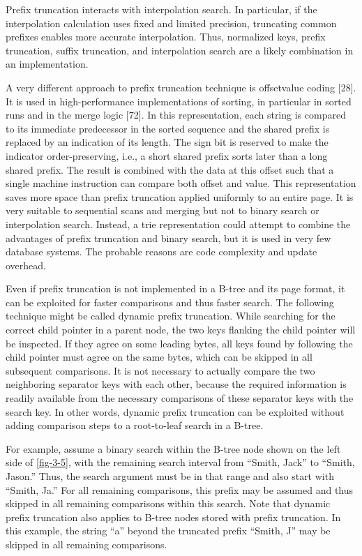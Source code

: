 Prefix truncation interacts with interpolation search. In particular, if
the interpolation calculation uses fixed and limited precision,
truncating common prefixes enables more accurate interpolation. Thus,
normalized keys, prefix truncation, suffix truncation, and interpolation
search are a likely combination in an implementation.

A very different approach to prefix truncation technique is offsetvalue
coding {[}28{]}. It is used in high-performance implementations of
sorting, in particular in sorted runs and in the merge logic {[}72{]}.
In this representation, each string is compared to its immediate
predecessor in the sorted sequence and the shared prefix is replaced by
an indication of its length. The sign bit is reserved to make the
indicator order-preserving, i.e., a short shared prefix sorts later than
a long shared prefix. The result is combined with the data at this
offset such that a single machine instruction can compare both offset
and value. This representation saves more space than prefix truncation
applied uniformly to an entire page. It is very suitable to sequential
scans and merging but not to binary search or interpolation search.
Instead, a trie representation could attempt to combine the advantages
of prefix truncation and binary search, but it is used in very few
database systems. The probable reasons are code complexity and update
overhead.

Even if prefix truncation is not implemented in a B-tree and its page
format, it can be exploited for faster comparisons and thus faster
search. The following technique might be called dynamic prefix
truncation. While searching for the correct child pointer in a parent
node, the two keys flanking the child pointer will be inspected. If they
agree on some leading bytes, all keys found by following the child
pointer must agree on the same bytes, which can be skipped in all
subsequent comparisons. It is not necessary to actually compare the two
neighboring separator keys with each other, because the required
information is readily available from the necessary comparisons of these
separator keys with the search key. In other words, dynamic prefix
truncation can be exploited without adding comparison steps to a
root-to-leaf search in a B-tree.

For example, assume a binary search within the B-tree node shown on the
left side of \autoref{fig-3-5}, with the remaining search interval from
``Smith, Jack'' to ``Smith, Jason.'' Thus, the search argument must be
in that range and also start with ``Smith, Ja.'' For all remaining
comparisons, this prefix may be assumed and thus skipped in all
remaining comparisons within this search. Note that dynamic prefix
truncation also applies to B-tree nodes stored with prefix truncation.
In this example, the string ``a'' beyond the truncated prefix ``Smith,
J'' may be skipped in all remaining comparisons.

